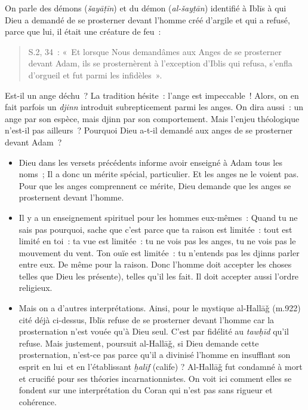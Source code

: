 {On parle des démons (\emph{šayāṭīn}) et du démon (\emph{al-šayṭān})
identifié à Iblīs à qui Dieu a demandé de se prosterner devant l'homme
créé d'argile et qui a refusé, parce que lui, il était une créature de
feu~:

\begin{quote}
S.2, 34~: «~Et lorsque Nous demandâmes aux Anges de se prosterner devant
Adam, ils se prosternèrent à l'exception d'Iblis qui refusa, s'enfla
d'orgueil et fut parmi les infidèles~».
\end{quote}


Est-il un ange déchu~? La tradition hésite~: l'ange est impeccable~!
Alors, on en fait parfois un \emph{djinn} introduit subrepticement parmi
les anges. On dira aussi~: un ange par son espèce, mais djinn par son
comportement. Mais l'enjeu théologique n'est-il pas ailleurs~? Pourquoi
Dieu a-t-il demandé aux anges de se prosterner devant Adam~?

\begin{itemize}
\item
  Dieu dans les versets précédents informe avoir enseigné à Adam tous
  les noms~; Il a donc un mérite spécial, particulier. Et les anges ne
  le voient pas. Pour que les anges comprennent ce mérite, Dieu demande
  que les anges se prosternent devant l'homme.
\item
  Il y a un enseignement spirituel pour les hommes eux-mêmes~: Quand tu
  ne sais pas pourquoi, sache que c'est parce que ta raison est
  limitée~: tout est limité en toi~: ta vue est limitée~: tu ne vois pas
  les anges, tu ne vois pas le mouvement du vent. Ton ouïe est limitée~:
  tu n'entends pas les djinns parler entre eux. De même pour la raison.
  Donc l'homme doit accepter les choses telles que Dieu les présente),
  telles qu'il les fait. Il doit accepter aussi l'ordre religieux.
\item
  Mais on a d'autres interprétations. Ainsi, pour le mystique al-Hallāǧ
  (m.922) cité déjà ci-dessus, Iblīs refuse de se prosterner devant
  l'homme car la prosternation n'est vouée qu'à Dieu seul. C'est par
  fidélité au \emph{tawḥīd} qu'il refuse. Mais justement, poursuit
  al-Hallāǧ, si Dieu demande cette prosternation, n'est-ce pas parce
  qu'il a divinisé l'homme en insufflant son esprit en lui~et en
  l'établissant \emph{ḫalīf} (calife) ? Al-Hallāǧ fut condamné à mort et
  crucifié pour ses théories incarnationnistes. On voit ici comment
  elles se fondent sur une interprétation du Coran qui n'est pas sans
  rigueur et cohérence.
\end{itemize}

}
